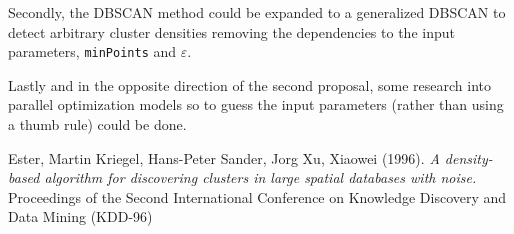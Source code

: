 \documentclass[10pt,journal,compsoc]{IEEEtran}
\begin{document}
Secondly, the DBSCAN method could be expanded to a generalized DBSCAN to detect arbitrary cluster densities removing the dependencies to the input parameters, \texttt{minPoints} and $\varepsilon$.

Lastly and in the opposite direction of the second proposal, some research into parallel optimization models so to guess the input parameters (rather than using a thumb rule) could be done.


\begin{thebibliography}{1}
Ester, Martin Kriegel, Hans-Peter Sander, Jorg Xu, Xiaowei (1996). \textit{A density-based algorithm for discovering clusters in large spatial databases with noise.} Proceedings of the Second International Conference on Knowledge Discovery and Data Mining (KDD-96)
\end{thebibliography}
\end{document}
